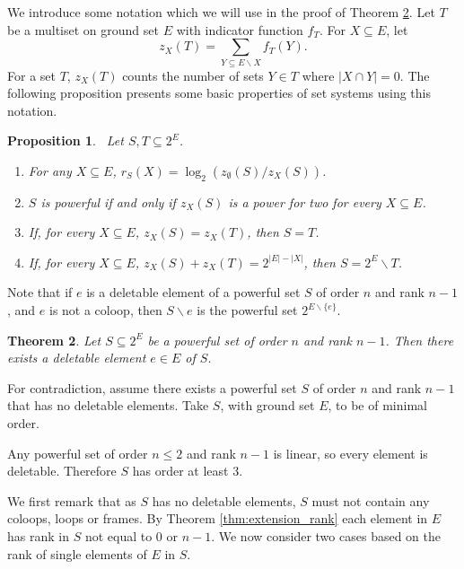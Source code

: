 \documentclass[10pt]{article}
\newtheorem{thm}{Theorem}[section]
\newtheorem{pro}[thm]{Proposition}
\theoremstyle{definition}
\def\pf{\noindent {\it Proof.\ }}
\begin{document}
We introduce some notation which we will use in the proof of Theorem \ref{thm:deletable_rank}. Let $T$ be a multiset on ground set $E$ with indicator function $f_T$. For $X\subseteq E$, let 
\begin{equation} 
    z_X(T)= \sum\limits_{Y\subseteq {E\backslash{ X}}}f_T(Y).
\end{equation}
For a set $T$, $z_X(T)$ counts the number of sets $Y\in T$ where $|X \cap Y|=0$. The following proposition presents some basic properties of set systems using this notation.  
\begin{pro}~\label{pro:z_stuff}
    Let $S,T\subseteq 2^E$.
\begin{enumerate}[ a)] 
    \item  For any $X\subseteq E$, $r_S(X)=\log_2\left(  z_\emptyset(S)/z_{X}(S)\right)$.
    
    \item   $S$ is powerful if and only if $z_X(S)$ is a power for two for every $X\subseteq E$.
    \item If, for every $X\subseteq E$, $z_X(S)=z_X(T)$, then $S=T$.

    \item  If, for every $X\subseteq E$, $z_X(S)+z_X(T)= 2^{|E|-|X|}$, then $S=2^E\backslash T$.
    
\end{enumerate}
\end{pro}


Note that if $e$ is a deletable element of a powerful set $S$ of order $n$ and rank $n-1$, and $e$ is not a coloop, then $S\backslash e$ is the powerful set $2^{E\backslash\{e\}}$. 

 	\begin{thm} \label{thm:deletable_rank}
 		Let $S\subseteq 2^E$ be a powerful set of order $n$ and rank $n-1$. Then there exists a deletable element $e\in E$ of $S$.
 	\end{thm}

 \pf 
  
 
For contradiction, assume there exists a powerful set $S$ of order $n$ and rank $n-1$ that has no deletable elements. Take $S$, with ground set $E$, to be of minimal order. 


Any powerful set of order $n\leq 2$ and rank $n-1$ is linear,  so every element is deletable. Therefore $S$ has order at least 3.  

 
We first remark that as $S$ has no deletable elements,  $S$ must not contain any coloops, loops or frames. By Theorem \ref{thm:extension_rank} each element in $E$ has rank in $S$ not equal to $0$ or $n-1$. We now consider two cases based on the rank of single elements of $E$ in $S$.
\end{document}
